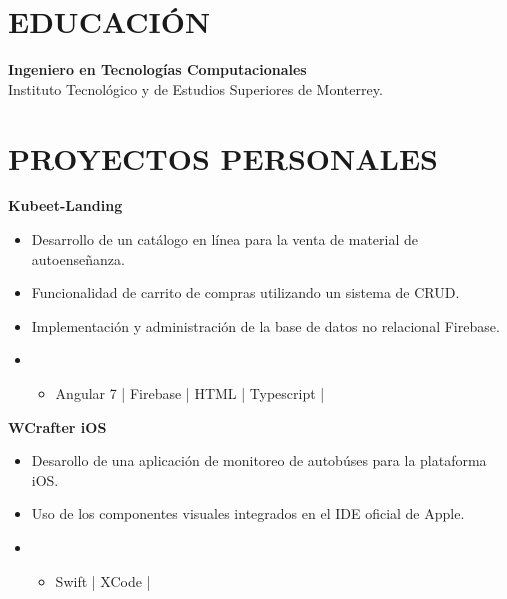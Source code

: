 \documentclass{res}
\begin{document}
\address{
}

\begin{resume}
    \vspace{-2mm}
    \separator

    \section{\large{EDUCACIÓN}} 
    \textbf{Ingeniero en Tecnologías Computacionales} 
     \\
    Instituto Tecnológico y de Estudios Superiores de Monterrey.
    
    \longjump

    \section{\large{PROYECTOS PERSONALES}} 
    \textbf{Kubeet-Landing} 
    \begin{itemize}
        \item Desarrollo de un catálogo en línea para la venta de material de autoenseñanza.
        \item Funcionalidad de carrito de compras utilizando un sistema de CRUD.
        \item Implementación y administración de la base de datos no relacional Firebase.
        \item {}
        \begin{itemize}
            \item Angular 7 | Firebase | HTML | Typescript |
        \end{itemize}
    \end{itemize}

    \textbf{WCrafter iOS} 
    \begin{itemize}
        \item Desarollo de una aplicación de monitoreo de autobúses para la plataforma iOS.
        \item Uso de los componentes visuales integrados en el IDE oficial de Apple.
        \item {}
        \begin{itemize}
            \item Swift | XCode |
        \end{itemize}
    \end{itemize}


\end{resume}
\end{document}
